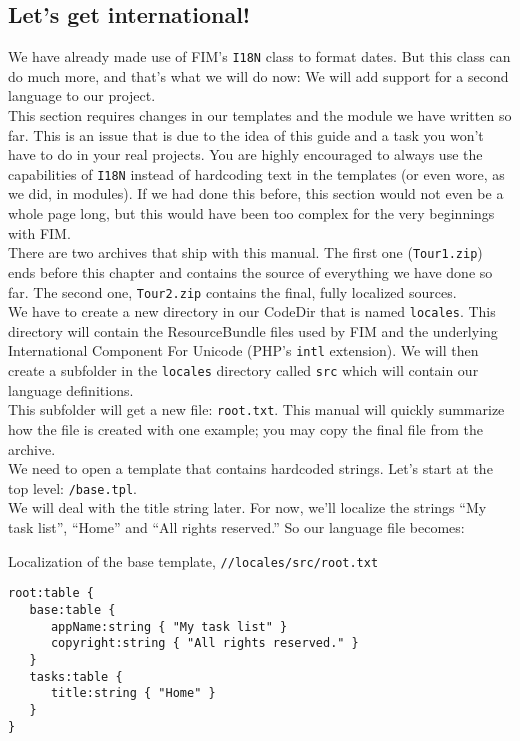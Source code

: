 \documentclass{scrartcl}
\begin{document}
   \subsection{Let's get international!}
      We have already made use of FIM's \lstinline!I18N! class to format dates. But this class can do much more, and that's what we will do now: We will add support for a second language to our project. \\
      This section requires changes in our templates and the module we have written so far. This is an issue that is due to the idea of this guide and a task you won't have to do in your real projects. You are highly encouraged to always use the capabilities of \lstinline!I18N! instead of hardcoding text in the templates (or even wore, as we did, in modules). If we had done this before, this section would not even be a whole page long, but this would have been too complex for the very beginnings with FIM. \\
      There are two archives that ship with this manual. The first one (\texttt{Tour1.zip}) ends before this chapter and contains the source of everything we have done so far. The second one, \texttt{Tour2.zip} contains the final, fully localized sources. \\
      We have to create a new directory in our CodeDir that is named \texttt{locales}. This directory will contain the ResourceBundle files used by FIM and the underlying International Component For Unicode (PHP's \texttt{intl} extension). We will then create a subfolder in the \texttt{locales} directory called \texttt{src} which will contain our language definitions. \\
      This subfolder will get a new file: \texttt{root.txt}. This manual will quickly summarize how the file is created with one example; you may copy the final file from the archive. \\
      We need to open a template that contains hardcoded strings. Let's start at the top level: \texttt{/base.tpl}. \\
      We will deal with the title string later. For now, we'll localize the strings ``My task list'', ``Home'' and ``All rights reserved.'' So our language file becomes:
      \begin{listing}[H]
         \caption{Localization of the base template, \texttt{//locales/src/root.txt}}
         \begin{verbatim}
root:table {
   base:table {
      appName:string { "My task list" }
      copyright:string { "All rights reserved." }
   }
   tasks:table {
      title:string { "Home" }
   }
}
         \end{verbatim}
      \end{listing}
\end{document}
